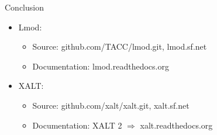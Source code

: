 \documentclass{beamer}
\begin{document}
\begin{frame}{Conclusion}
  \begin{itemize}
    \item Lmod:
      \begin{itemize}
        \item Source: github.com/TACC/lmod.git, lmod.sf.net
        \item Documentation: lmod.readthedocs.org
      \end{itemize}
    \item XALT:
      \begin{itemize}
        \item Source: github.com/xalt/xalt.git, xalt.sf.net
        \item Documentation: XALT 2 $\Rightarrow$ xalt.readthedocs.org
      \end{itemize}
  \end{itemize}
\end{frame}

%
\end{document}
